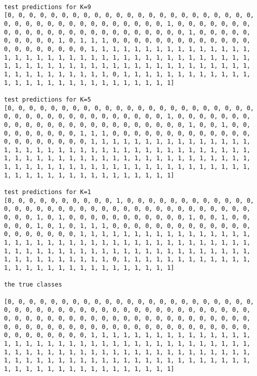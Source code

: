 \documentclass[11pt]{article}
\begin{document}
    \begin{Verbatim}[commandchars=\\\{\}]

test predictions for K=9
[0, 0, 0, 0, 0, 0, 0, 0, 0, 0, 0, 0, 0, 0, 0, 0, 0, 0, 0, 0, 0, 0, 0, 0, 0, 0, 0, 0, 0, 0, 0, 0, 0, 0, 0, 0, 0, 0, 1, 0, 0, 0, 0, 0, 0, 0, 0, 0, 0, 0, 0, 0, 0, 0, 0, 0, 0, 0, 0, 0, 0, 0, 0, 1, 0, 0, 0, 0, 0, 0, 0, 0, 0, 0, 1, 0, 1, 1, 1, 0, 0, 0, 0, 0, 0, 0, 0, 0, 0, 0, 0, 0, 0, 0, 0, 0, 0, 0, 0, 0, 1, 1, 1, 1, 1, 1, 1, 1, 1, 1, 1, 1, 1, 1, 1, 1, 1, 1, 1, 1, 1, 1, 1, 1, 1, 1, 1, 1, 1, 1, 1, 1, 1, 1, 1, 1, 1, 1, 1, 1, 1, 1, 1, 1, 1, 1, 1, 1, 1, 1, 1, 1, 1, 1, 1, 1, 1, 1, 1, 1, 1, 1, 1, 1, 1, 1, 1, 1, 1, 1, 1, 0, 1, 1, 1, 1, 1, 1, 1, 1, 1, 1, 1, 1, 1, 1, 1, 1, 1, 1, 1, 1, 1, 1, 1, 1, 1, 1, 1, 1]

test predictions for K=5
[0, 0, 0, 0, 0, 0, 0, 0, 0, 0, 0, 0, 0, 0, 0, 0, 0, 0, 0, 0, 0, 0, 0, 0, 0, 0, 0, 0, 0, 0, 0, 0, 0, 0, 0, 0, 0, 0, 1, 0, 0, 0, 0, 0, 0, 0, 0, 0, 0, 0, 0, 0, 0, 0, 0, 0, 0, 0, 0, 0, 0, 0, 0, 1, 0, 0, 1, 0, 0, 0, 0, 0, 0, 0, 0, 0, 1, 1, 1, 0, 0, 0, 0, 0, 0, 0, 0, 0, 0, 0, 0, 0, 0, 0, 0, 0, 0, 0, 0, 0, 1, 1, 1, 1, 1, 1, 1, 1, 1, 1, 1, 1, 1, 1, 1, 1, 1, 1, 1, 1, 1, 1, 1, 1, 1, 1, 1, 1, 1, 1, 1, 1, 1, 1, 1, 1, 1, 1, 1, 1, 1, 1, 1, 1, 1, 1, 1, 1, 1, 1, 1, 1, 1, 1, 1, 1, 1, 1, 1, 1, 1, 1, 1, 1, 1, 1, 1, 1, 1, 1, 1, 1, 1, 1, 1, 1, 1, 1, 1, 1, 1, 1, 1, 1, 1, 1, 1, 1, 1, 1, 1, 1, 1, 1, 1, 1, 1, 1, 1, 1]

test predictions for K=1
[0, 0, 0, 0, 0, 0, 0, 0, 0, 0, 1, 0, 0, 0, 0, 0, 0, 0, 0, 0, 0, 0, 0, 0, 0, 0, 0, 0, 0, 0, 0, 0, 0, 0, 0, 0, 0, 0, 0, 0, 0, 0, 0, 0, 0, 0, 0, 0, 0, 1, 0, 1, 0, 0, 0, 0, 0, 0, 0, 0, 0, 0, 0, 1, 0, 0, 1, 0, 0, 0, 0, 0, 1, 0, 1, 0, 1, 1, 1, 0, 0, 0, 0, 0, 0, 0, 0, 0, 0, 0, 0, 0, 0, 0, 0, 0, 0, 0, 0, 1, 1, 1, 1, 1, 1, 1, 1, 1, 1, 1, 1, 1, 1, 1, 1, 1, 1, 1, 1, 1, 1, 1, 1, 1, 1, 1, 1, 1, 1, 1, 1, 1, 1, 1, 1, 1, 1, 1, 1, 1, 1, 1, 1, 1, 1, 1, 1, 1, 1, 1, 1, 1, 1, 1, 1, 1, 1, 1, 1, 1, 1, 1, 1, 1, 1, 1, 1, 1, 1, 1, 1, 0, 1, 1, 1, 1, 1, 1, 1, 1, 1, 1, 1, 1, 1, 1, 1, 1, 1, 1, 1, 1, 1, 1, 1, 1, 1, 1, 1, 1]

the true classes

[0, 0, 0, 0, 0, 0, 0, 0, 0, 0, 0, 0, 0, 0, 0, 0, 0, 0, 0, 0, 0, 0, 0, 0, 0, 0, 0, 0, 0, 0, 0, 0, 0, 0, 0, 0, 0, 0, 0, 0, 0, 0, 0, 0, 0, 0, 0, 0, 0, 0, 0, 0, 0, 0, 0, 0, 0, 0, 0, 0, 0, 0, 0, 0, 0, 0, 0, 0, 0, 0, 0, 0, 0, 0, 0, 0, 0, 0, 0, 0, 0, 0, 0, 0, 0, 0, 0, 0, 0, 0, 0, 0, 0, 0, 0, 0, 0, 0, 0, 0, 1, 1, 1, 1, 1, 1, 1, 1, 1, 1, 1, 1, 1, 1, 1, 1, 1, 1, 1, 1, 1, 1, 1, 1, 1, 1, 1, 1, 1, 1, 1, 1, 1, 1, 1, 1, 1, 1, 1, 1, 1, 1, 1, 1, 1, 1, 1, 1, 1, 1, 1, 1, 1, 1, 1, 1, 1, 1, 1, 1, 1, 1, 1, 1, 1, 1, 1, 1, 1, 1, 1, 1, 1, 1, 1, 1, 1, 1, 1, 1, 1, 1, 1, 1, 1, 1, 1, 1, 1, 1, 1, 1, 1, 1, 1, 1, 1, 1, 1, 1]

    \end{Verbatim}
\end{document}

